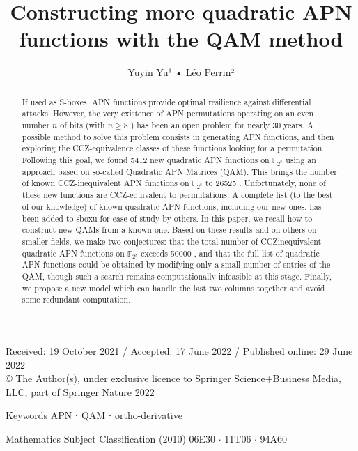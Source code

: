 \documentclass[10pt]{article}
\title{Constructing more quadratic APN functions with the QAM method }
\author{Yuyin Yu¹ • Léo Perrin²}
\date{}
\begin{document}
\maketitle
Received: 19 October 2021 / Accepted: 17 June 2022 / Published online: 29 June 2022\\
© The Author(s), under exclusive licence to Springer Science+Business Media, LLC, part of Springer Nature 2022

\begin{abstract}
If used as S-boxes, APN functions provide optimal resilience against differential attacks. However, the very existence of APN permutations operating on an even number $n$ of bits (with $n \geq 8$ ) has been an open problem for nearly 30 years. A possible method to solve this problem consists in generating APN functions, and then exploring the CCZ-equivalence classes of these functions looking for a permutation. Following this goal, we found 5412 new quadratic APN functions on $\mathbb{F}_{2^{8}}$ using an approach based on so-called Quadratic APN Matrices (QAM). This brings the number of known CCZ-inequivalent APN functions on $\mathbb{F}_{2^{8}}$ to 26525 . Unfortunately, none of these new functions are CCZ-equivalent to permutations. A complete list (to the best of our knowledge) of known quadratic APN functions, including our new ones, has been added to sboxu for ease of study by others. In this paper, we recall how to construct new QAMs from a known one. Based on these results and on others on smaller fields, we make two conjectures: that the total number of CCZinequivalent quadratic APN functions on $\mathbb{F}_{2^{8}}$ exceeds 50000 , and that the full list of quadratic APN functions could be obtained by modifying only a small number of entries of the QAM, though such a search remains computationally infeasible at this stage. Finally, we propose a new model which can handle the last two columns together and avoid some redundant computation.
\end{abstract}

Keywords APN ⋅ QAM ⋅ ortho-derivative

Mathematics Subject Classification (2010) 06E30 $\cdot$ 11T06 $\cdot$ 94A60
\end{document}
